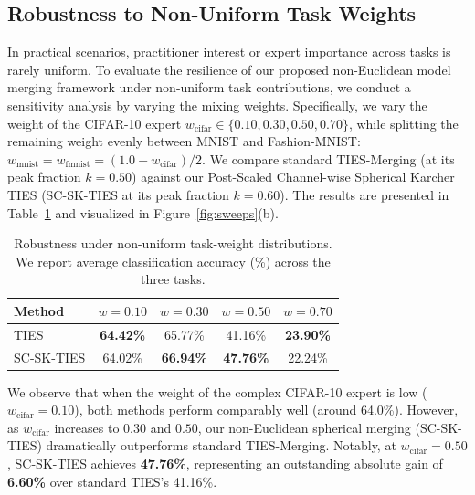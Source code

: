 \documentclass{article}
\begin{document}
\subsection{Robustness to Non-Uniform Task Weights}
In practical scenarios, practitioner interest or expert importance across tasks is rarely uniform. To evaluate the resilience of our proposed non-Euclidean model merging framework under non-uniform task contributions, we conduct a sensitivity analysis by varying the mixing weights. Specifically, we vary the weight of the CIFAR-10 expert $w_{\text{cifar}} \in \{0.10, 0.30, 0.50, 0.70\}$, while splitting the remaining weight evenly between MNIST and Fashion-MNIST: $w_{\text{mnist}} = w_{\text{fmnist}} = (1.0 - w_{\text{cifar}}) / 2$. We compare standard TIES-Merging (at its peak fraction $k=0.50$) against our Post-Scaled Channel-wise Spherical Karcher TIES (SC-SK-TIES at its peak fraction $k=0.60$). The results are presented in Table~\ref{tab:unequal_weights} and visualized in Figure~\ref{fig:sweeps}(b).

\begin{table}[h]
\caption{Robustness under non-uniform task-weight distributions. We report average classification accuracy (\%) across the three tasks.}
\label{tab:unequal_weights}
\begin{center}
\begin{small}
\setlength{\tabcolsep}{4pt}
\begin{tabular}{lcccc}
\toprule
\textbf{Method} & $w\!=\!0.10$ & $w\!=\!0.30$ & $w\!=\!0.50$ & $w\!=\!0.70$ \\
\midrule
TIES & \textbf{64.42\%} & 65.77\% & 41.16\% & \textbf{23.90\%} \\
SC-SK-TIES & 64.02\% & \textbf{66.94\%} & \textbf{47.76\%} & 22.24\% \\
\bottomrule
\end{tabular}
\end{small}
\end{center}
\vskip -0.15in
\end{table}

We observe that when the weight of the complex CIFAR-10 expert is low ($w_{\text{cifar}}=0.10$), both methods perform comparably well (around 64.0\%). However, as $w_{\text{cifar}}$ increases to $0.30$ and $0.50$, our non-Euclidean spherical merging (SC-SK-TIES) dramatically outperforms standard TIES-Merging. Notably, at $w_{\text{cifar}}=0.50$, SC-SK-TIES achieves \textbf{47.76\%}, representing an outstanding absolute gain of \textbf{6.60\%} over standard TIES's 41.16\%. 
\end{document}
